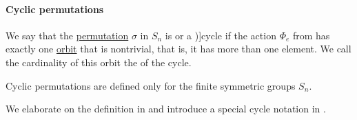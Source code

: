 \paragraph{Cyclic permutations}

\begin{definition}\label{def:cyclic_permutation}
  We say that the \hyperref[def:symmetric_group]{permutation} \( \sigma \) in \( S_n \) is  or a \term[ru=цикл (\cite[sec. 4.3]{Тыртышников2007ЛинейнаяАлгебра})]{cycle} if the action \( \Phi_e \) from  has exactly one \hyperref[def:group_action_orbit]{orbit} that is nontrivial, that is, it has more than one element. We call the cardinality of this orbit the  of the cycle.
\end{definition}
\begin{comments}
  \item Cyclic permutations are defined only for the finite symmetric groups \( S_n \).
  \item We elaborate on the definition in  and introduce a special cycle notation in .
\end{comments}

